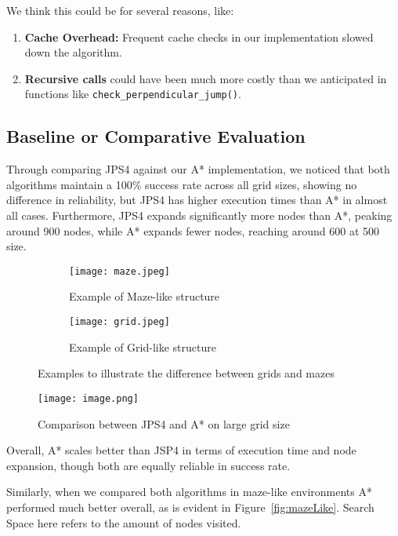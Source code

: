 \documentclass[11pt]{article}
\begin{document}
We think this could be for several reasons, like:

\begin{enumerate}
    \item \textbf{Cache Overhead:} Frequent cache checks in our implementation slowed down the algorithm.
    \item \textbf{Recursive calls} could have been much more costly than we anticipated in functions like \texttt{check\_perpendicular\_jump()}.
\end{enumerate}

\subsection{Baseline or Comparative Evaluation}

Through comparing JPS4 against our A* implementation, we noticed that both algorithms maintain a 100\% success rate across all grid sizes, showing no difference in reliability, but JPS4 has higher execution times than A* in almost all cases. Furthermore, JPS4 expands significantly more nodes than A*, peaking around 900 nodes, while A* expands fewer nodes, reaching around 600 at 500 size.

\begin{figure}[h]
    \centering
    \begin{subfigure}{0.45\textwidth}
        \centering
        \texttt{[image: maze.jpeg]}
        \caption{Example of Maze-like structure}
    \end{subfigure}
    \hfill
    \begin{subfigure}{0.45\textwidth}
        \centering
        \texttt{[image: grid.jpeg]}
        \caption{Example of Grid-like structure}
    \end{subfigure}
    \caption{Examples to illustrate the difference between grids and mazes}
    \label{fig:two_images}
\end{figure}



\begin{figure}[h!]
    \centering
    \texttt{[image: image.png]}
    \caption{Comparison between JPS4 and A* on large grid size}
    \label{fig:enter-label}
\end{figure}


Overall, A* scales better than JSP4 in terms of execution time and node expansion, though both are equally reliable in success rate.


Similarly, when we compared both algorithms in maze-like environments A* performed much better overall, as is evident in Figure~\ref{fig:mazeLike}. Search Space here refers to the amount of nodes visited.
\end{document}
